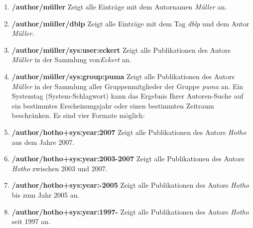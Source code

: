 \documentclass[b5paper,11pt,twoside]{scrbook} %
\begin{document}
\begin{enumerate}
    \item \textbf{/author/müller} \newline
    Zeigt alle Einträge mit dem Autornamen \textit{Müller} an.
    \item \textbf{/author/müller/dblp} \newline
    Zeigt alle Einträge mit dem Tag \textit{dblp} und dem Autor \textit{Müller}.
    \item \textbf{/author/müller/sys:user:eckert}\newline
    Zeigt alle Publikationen des Autors \textit{Müller} in der Sammlung von\textit{Eckert} an.
    \item \textbf{/author/müller/sys:group:puma} \newline
    Zeigt alle Publikationen des Autors \textit{Müller} in der Sammlung aller Gruppenmitglieder der Gruppe \textit{puma} an. 
\newline
\newline
Ein Systemtag (System-Schlagwort) kann das Ergebnis Ihrer Autoren-Suche auf ein bestimmtes Erscheinungsjahr oder einen bestimmten Zeitraum beschränken. Es sind vier Formate möglich:%
    \item \textbf{/author/hotho+sys:year:2007} \newline
    Zeigt alle Publikationen des Autors \textit{Hotho} aus dem Jahre 2007.
    \item \textbf{/author/hotho+sys:year:2003-2007} \newline
    Zeigt alle Publikationen des Autors \textit{Hotho} zwischen 2003 und 2007.
    \item \textbf{/author/hotho+sys:year:-2005} \newline
    Zeigt alle Publikationen des Autors \textit{Hotho} bis zum Jahr 2005 an.
    \item \textbf{/author/hotho+sys:year:1997-} \newline
    Zeigt alle Publikationen des Autors \textit{Hotho} seit 1997 an.
\end{enumerate}
\end{document}
